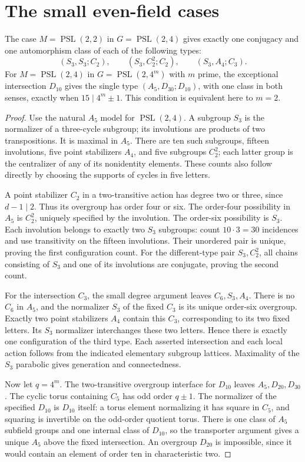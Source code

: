 \documentclass[11pt]{article}
\newcommand{\PSL}{\operatorname{PSL}}\newcommand{\PGL}{\operatorname{PGL}}
\begin{document}
\section{The small even-field cases}
\begin{theorem}\label{small-even}
The case $M=\PSL(2,2)$ in $G=\PSL(2,4)$ gives exactly one
conjugacy and one automorphism class of each of the following types:
\[
 (S_3,S_3;C_2),\qquad(S_3,C_2^2;C_2),\qquad(S_3,A_4;C_3).
\]
For $M=\PSL(2,4)$ in $G=\PSL(2,4^m)$ with $m$ prime,
the exceptional intersection $D_{10}$ gives the single type
$(A_5,D_{30};D_{10})$, with one class in both senses, exactly
when $15\mid4^m\pm1$. This condition is equivalent here to $m=2$.
\end{theorem}
\begin{proof}
Use the natural $A_5$ model for $\PSL(2,4)$. A subgroup $S_3$
is the normalizer of a three-cycle subgroup; its involutions are
products of two transpositions. It is maximal in $A_5$. There are
ten such subgroups, fifteen involutions, five point stabilizers
$A_4$, and five subgroups $C_2^2$; each latter group is the
centralizer of any of its nonidentity elements. These counts also
follow directly by choosing the supports of cycles in five letters.

A point stabilizer $C_2$ in a two-transitive action has degree two
or three, since $d-1\mid2$. Thus its overgroup has order four
or six. The order-four possibility in $A_5$ is $C_2^2$, uniquely
specified by the involution. The order-six possibility is $S_3$.
Each involution belongs to exactly two $S_3$ subgroups: count
$10\cdot3=30$ incidences and use transitivity on the fifteen
involutions. Their unordered pair is unique, proving the first
configuration count. For the different-type pair $S_3,C_2^2$,
all chains consisting of $S_3$ and one of its involutions are
conjugate, proving the second count.

For the intersection $C_3$, the small degree argument leaves
$C_6,S_3,A_4$. There is no $C_6$ in $A_5$, and the normalizer
$S_3$ of the fixed $C_3$ is its unique order-six overgroup.
Exactly two point stabilizers $A_4$ contain this $C_3$, corresponding
to its two fixed letters. Its $S_3$ normalizer interchanges these
two letters. Hence there is exactly one configuration of the third
type. Each asserted intersection and each local action follows from
the indicated elementary subgroup lattices. Maximality of the
$S_3$ parabolic gives generation and connectedness.

Now let $q=4^m$. The two-transitive overgroup interface for $D_{10}$
leaves $A_5,D_{20},D_{30}$. The cyclic torus containing $C_5$
has odd order $q\pm1$. The normalizer of the specified $D_{10}$
is $D_{10}$ itself: a torus element normalizing it has square in
$C_5$, and squaring is invertible on the odd-order quotient torus.
There is one class of $A_5$ subfield groups and one internal class
of $D_{10}$, so the transporter argument gives a unique $A_5$
above the fixed intersection. An overgroup $D_{20}$ is impossible,
since it would contain an element of order ten in characteristic two.


\end{proof}
\end{document}
